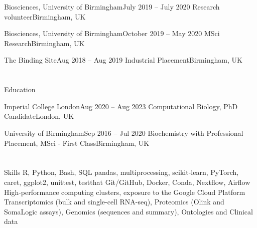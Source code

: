     \resumeEntryTSDL
    {Biosciences, University of Birmingham}{July 2019 – July 2020}
    {Research volunteer}{Birmingham, UK}
    \resumeItemListStart
    \resumeItemListEnd

    \resumeEntryTSDL
    {Biosciences, University of Birmingham}{October 2019 – May 2020}
    {MSci Research}{Birmingham, UK}
    \resumeItemListStart
    \resumeItemListEnd

    \resumeEntryTSDL
    {The Binding Site}{Aug 2018 -- Aug 2019}
    {Industrial Placement}{Birmingham, UK}
    \resumeItemListStart
    \resumeItemListEnd
\resumeEntryEnd

\section{\faGraduationCap}{Education}

  \resumeEntryStart
    \resumeEntryTSDL
      {Imperial College London}{Aug 2020 -- Aug 2023}
      {Computational Biology, PhD Candidate}{London, UK}
  \vspace{6pt}
  
    \resumeEntryTSDL
      {University of Birmingham}{Sep 2016 -- Jul 2020}
      {Biochemistry with Professional Placement, MSci - First Class}{Birmingham, UK}
  \resumeEntryEnd


\section{\faGears}{Skills}
 \resumeEntryStart
   {R, Python, Bash, SQL}
   {pandas, multiprocessing, scikit-learn, PyTorch, caret, ggplot2, unittest, testthat}
   {Git/GitHub, Docker, Conda, Nextflow, Airflow}  %
   {High-performance computing clusters, exposure to the Google Cloud Platform}
   {Transcriptomics (bulk and single-cell RNA-seq), Proteomics (Olink and SomaLogic assays), Genomics (sequences and summary), Ontologies and Clinical data}
 \resumeEntryEnd

